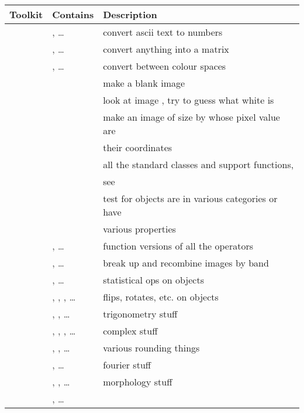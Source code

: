 \begin{tab2}
\begin{center}
\begin{tabular}{||l|l|l||}
\hline
Toolkit & Contains & Description \\
\hline
\ct{\_convert}		& \ct{parse\_int l}, \ldots{}  		& 
	convert ascii text to numbers \\
			& \ct{to\_matrix x}, \ldots{}  		& 
	convert anything into a matrix \\
			& \ct{colour\_transform\_to to x}, \ldots{}	& 
	convert between colour spaces \\
\hline
\ct{\_generate}		& \ct{image\_new w h ...}  		& 
	make a blank image \\
			& \ct{image\_white i}  			& 
	look at image \ct{i}, try to guess what white is \\
			& \ct{make\_xy w h}  			& 
	make an image of size \ct{w} by \ct{h} whose pixel value are \\
			& 		  			& 
	their coordinates \\
\hline
\ct{\_types}		& \ct{Image i}  			& 
	all the standard classes and support functions, \\
			& 		  			& 
	see \pref{sec:object} \\
\hline
\ct{\_predicate}	& \ct{is\_colour\_space i} 		& 
	test for objects are in various categories or have \\
			& 		  			& 
	various properties \\
\hline
\ct{\_stdenv}		& \ct{logical\_and x}, \ldots{}		& 
	function versions of all the operators \\
			& \ct{bandsplit i}, \ldots{}		& 
	break up and recombine images by band \\
			& \ct{mean x}, \ldots{}			& 
	statistical ops on objects \\
			& \ct{transpose x}, \ct{flipud x}, \ct{rot90 x},
			\ldots{} 				& 
	flips, rotates, etc. on objects \\
			& \ct{rad x}, \ct{pi}, \ldots{}		& 
	trigonometry stuff \\
			& \ct{sign x}, \ct{conj x}, \ct{polar x}, \ldots{} & 
	complex stuff \\
			& \ct{rint x}, \ct{ceil x}, \ldots{}	& 
	various rounding things \\
			& \ct{fwfft x}, \ldots{}		& 
	fourier stuff \\
			& \ct{dilate m x}, \ct{rank w h n i}, \ldots{} & 
	morphology stuff \\
			& \ct{conv m x}, \ldots{}		& 

\end{tabular}
\end{center}
\end{tab2}
